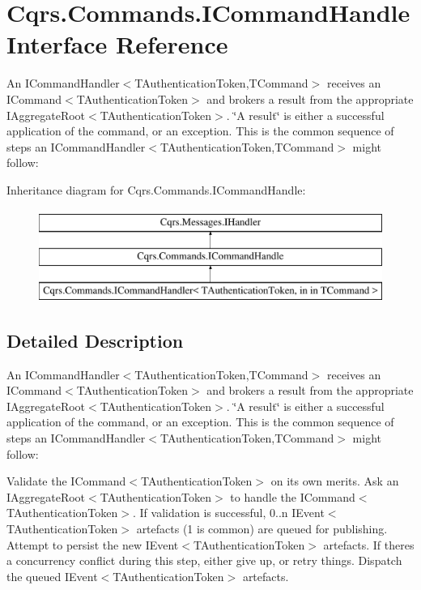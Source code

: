 \hypertarget{interfaceCqrs_1_1Commands_1_1ICommandHandle}{}\section{Cqrs.\+Commands.\+I\+Command\+Handle Interface Reference}
\label{interfaceCqrs_1_1Commands_1_1ICommandHandle}


An I\+Command\+Handler$<$\+T\+Authentication\+Token,\+T\+Command$>$ receives an I\+Command$<$\+T\+Authentication\+Token$>$ and brokers a result from the appropriate I\+Aggregate\+Root$<$\+T\+Authentication\+Token$>$. \char`\"{}\+A result\char`\"{} is either a successful application of the command, or an exception. This is the common sequence of steps an I\+Command\+Handler$<$\+T\+Authentication\+Token,\+T\+Command$>$ might follow\+:  


Inheritance diagram for Cqrs.\+Commands.\+I\+Command\+Handle\+:\begin{figure}[H]
\begin{center}
\leavevmode
\includegraphics[height=3.000000cm]{interfaceCqrs_1_1Commands_1_1ICommandHandle}
\end{center}
\end{figure}


\subsection{Detailed Description}
An I\+Command\+Handler$<$\+T\+Authentication\+Token,\+T\+Command$>$ receives an I\+Command$<$\+T\+Authentication\+Token$>$ and brokers a result from the appropriate I\+Aggregate\+Root$<$\+T\+Authentication\+Token$>$. \char`\"{}\+A result\char`\"{} is either a successful application of the command, or an exception. This is the common sequence of steps an I\+Command\+Handler$<$\+T\+Authentication\+Token,\+T\+Command$>$ might follow\+: 

Validate the I\+Command$<$\+T\+Authentication\+Token$>$ on its own merits. Ask an I\+Aggregate\+Root$<$\+T\+Authentication\+Token$>$ to handle the I\+Command$<$\+T\+Authentication\+Token$>$. If validation is successful, 0..n I\+Event$<$\+T\+Authentication\+Token$>$ artefacts (1 is common) are queued for publishing. Attempt to persist the new I\+Event$<$\+T\+Authentication\+Token$>$ artefacts. If there\textquotesingle{}s a concurrency conflict during this step, either give up, or retry things. Dispatch the queued I\+Event$<$\+T\+Authentication\+Token$>$ artefacts. 

